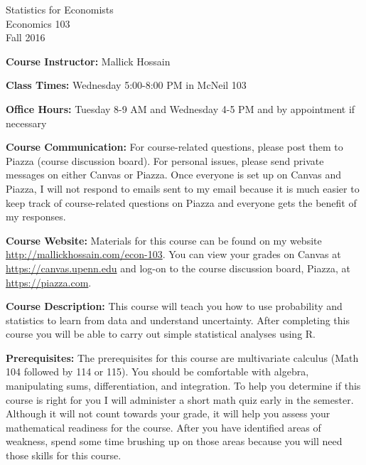 \documentclass[11pt, letterpaper]{article}
\begin{document}
\thispagestyle{plain}

\begin{center}
\Large
\sc
Statistics for Economists\\
\large
Economics 103\\
\large
Fall 2016
\end{center}


\normalsize
\bigskip
\noindent \textbf{Course Instructor:} Mallick Hossain

\medskip

\noindent \textbf{Class Times:} Wednesday 5:00-8:00 PM in McNeil 103

\medskip

\noindent \textbf{Office Hours:} Tuesday 8-9 AM and Wednesday 4-5 PM and by appointment if necessary

\medskip

\noindent \textbf{Course Communication:} 
For course-related questions, please post them to Piazza (course discussion board). 
For personal issues, please send private messages on either Canvas or Piazza. 
Once everyone is set up on Canvas and Piazza, I will not respond to emails sent to my email because it is much easier to keep track of course-related questions on Piazza and everyone gets the benefit of my responses. 

\medskip
 
\noindent \textbf{Course Website:} Materials for this course can be found on my website \url{http://mallickhossain.com/econ-103}. 
You can view your grades on Canvas at \url{https://canvas.upenn.edu} and log-on to the course discussion board, Piazza, at \url{https://piazza.com}.

\medskip

\noindent \textbf{Course Description:} 
This course will teach you how to use probability and statistics to learn from data and understand uncertainty. 
After completing this course you will be able to carry out simple statistical analyses using R.

\medskip

\noindent \textbf{Prerequisites:} 
The prerequisites for this course are multivariate calculus (Math 104 followed by 114 or 115). 
You should be comfortable with algebra, manipulating sums, differentiation, and integration. 
To help you determine if this course is right for you I will administer a short math quiz early in the semester. 
Although it will not count towards your grade, it will help you assess your mathematical readiness for the course. 
After you have identified areas of weakness, spend some time brushing up on those areas because you will need those skills for this course.
\end{document}
